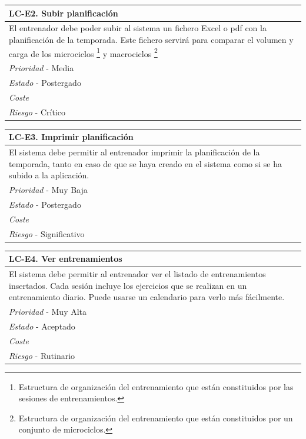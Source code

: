 	\begin{center}
		\begin{tabularx}{15cm}{|X|}
			\hline 
				\bf{LC-E2. Subir planificación}\\
			\hline
				El entrenador debe poder subir al sistema un fichero Excel o pdf con la planificación de la temporada. Este fichero servirá para comparar el volumen y carga de los microciclos \footnote{Estructura de organización del entrenamiento que están constituidos por las sesiones de entrenamientos.} y macrociclos \footnote{Estructura de organización del entrenamiento que están constituidos por un conjunto de microciclos.}\\
			\hline
				{\it Prioridad} - Media\\
			\hline
				{\it Estado} - Postergado\\
			\hline
				{\it Coste}\\
			\hline
				{\it Riesgo} - Crítico\\
			\hline
		\end{tabularx}
	\end{center}
	
	\begin{center}
		\begin{tabularx}{15cm}{|X|}
			\hline 
				\bf{LC-E3. Imprimir planificación}\\
			\hline
				El sistema debe permitir al entrenador imprimir la planificación de la temporada, tanto en caso de que se haya creado en el sistema como si se ha subido a la aplicación.\\
			\hline
				{\it Prioridad} - Muy Baja\\
			\hline
				{\it Estado} - Postergado\\
			\hline
				{\it Coste}\\
			\hline
				{\it Riesgo} - Significativo\\
			\hline
		\end{tabularx}
	\end{center}
	
	\begin{center}
		\begin{tabularx}{15cm}{|X|}
			\hline 
				\bf{LC-E4. Ver entrenamientos}\\
			\hline
				El sistema debe permitir al entrenador ver el listado de entrenamientos insertados. Cada sesión incluye los ejercicios que se realizan en un entrenamiento diario. Puede usarse un calendario para verlo más fácilmente.\\
			\hline
				{\it Prioridad} - Muy Alta\\
			\hline
				{\it Estado} - Aceptado\\
			\hline
				{\it Coste}\\
			\hline
				{\it Riesgo} - Rutinario\\
			\hline
		\end{tabularx}
	\end{center}
	
